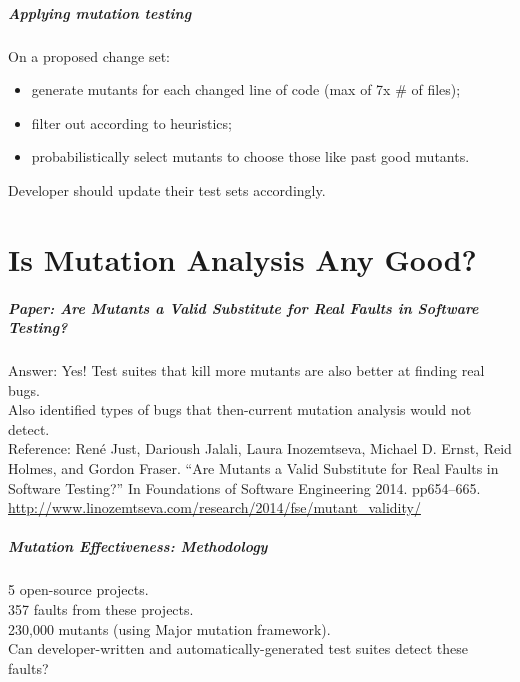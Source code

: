 \documentclass{beamer}
\newenvironment{changemargin}[1]{%
  \begin{list}{}{%
    \setlength{\topsep}{0pt}%
    \setlength{\leftmargin}{#1}%
    \setlength{\rightmargin}{1em}
    \setlength{\listparindent}{\parindent}%
    \setlength{\itemindent}{\parindent}%
    \setlength{\parsep}{\parskip}%
  }%
  \item[]}{\end{list}}
\begin{document}
\begin{frame}
  \frametitle{Applying mutation testing}
  \large
  \begin{changemargin}{2em}
    On a proposed change set:
    \begin{itemize}
    \item generate mutants for each changed line of code (max of 7x \# of files);
    \item filter out according to heuristics;
    \item probabilistically select mutants to choose those like past good mutants.
    \end{itemize}
    Developer should update their test sets accordingly.
  \end{changemargin}
\end{frame}

\part{Is Mutation Analysis Any Good?}
\begin{frame}
  \partpage
\end{frame}

\begin{frame}
  \frametitle{Paper: Are Mutants a Valid Substitute for Real Faults in Software Testing?}


  \begin{changemargin}{2em}
    \large
Answer: \alert{Yes!} Test suites
that kill more mutants are also better at finding real bugs. \\[1em]
Also identified types of bugs that then-current mutation analysis would not detect. \\[1em]

\scriptsize
Reference: René Just, Darioush Jalali, Laura Inozemtseva, Michael D. Ernst, Reid Holmes, and
Gordon Fraser. “Are Mutants a Valid Substitute for Real Faults in Software Testing?” In Foundations of Software Engineering 2014. pp654–665. \url{http://www.linozemtseva.com/research/2014/fse/mutant_validity/}\\[1em]
  \end{changemargin}
\end{frame}

\begin{frame}
  \frametitle{Mutation Effectiveness: Methodology}
  \Large
  \begin{changemargin}{2em}
    5 open-source projects.\\
    357 faults from these projects.\\
    230,000 mutants (using Major mutation framework).\\[1em]
    Can developer-written and automatically-generated test suites detect these faults?
  \end{changemargin}
\end{frame}
\end{document}
